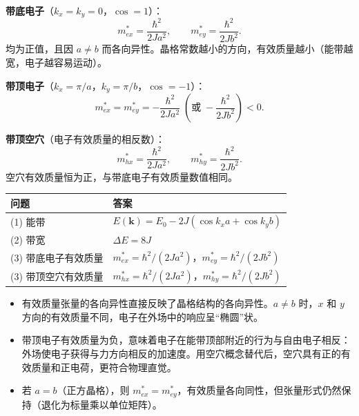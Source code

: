 \begin{derivationbox}[标准解题过程]
\textbf{带底电子}（$k_x=k_y=0$，$\cos=1$）：
\begin{equation}
\boxed{m_{ex}^*=\frac{\hbar^2}{2Ja^2},\qquad m_{ey}^*=\frac{\hbar^2}{2Jb^2}.}
\end{equation}
均为正值，且因 $a\neq b$ 而各向异性。晶格常数越小的方向，有效质量越小（能带越宽，电子越容易运动）。

\textbf{带顶电子}（$k_x=\pi/a$，$k_y=\pi/b$，$\cos=-1$）：
\begin{equation}
m_{ex}^*=m_{ey}^*=-\frac{\hbar^2}{2Ja^2}\;(\text{或}\;-\frac{\hbar^2}{2Jb^2})<0.
\end{equation}

\textbf{带顶空穴}（电子有效质量的相反数）：
\begin{equation}
\boxed{m_{hx}^*=\frac{\hbar^2}{2Ja^2},\qquad m_{hy}^*=\frac{\hbar^2}{2Jb^2}.}
\end{equation}
空穴有效质量恒为正，与带底电子有效质量数值相同。
\end{derivationbox}

\begin{formulabox}[答案汇总]
\begin{center}
\begin{tabular}{ll}
\toprule
\textbf{问题} & \textbf{答案} \\
\midrule
(1) 能带 & $E(\bm{k})=E_0-2J(\cos k_xa+\cos k_yb)$ \\
(2) 带宽 & $\Delta E=8J$ \\
(3) 带底电子有效质量 & $m_{ex}^*=\hbar^2/(2Ja^2)$，$m_{ey}^*=\hbar^2/(2Jb^2)$ \\
(3) 带顶空穴有效质量 & $m_{hx}^*=\hbar^2/(2Ja^2)$，$m_{hy}^*=\hbar^2/(2Jb^2)$ \\
\bottomrule
\end{tabular}
\end{center}
\end{formulabox}

\begin{insightbox}[物理图像]
\begin{itemize}
    \item 有效质量张量的各向异性直接反映了晶格结构的各向异性。$a\neq b$ 时，$x$ 和 $y$ 方向的有效质量不同，电子在外场中的响应呈``椭圆''状。
    \item 带顶电子有效质量为负，意味着电子在能带顶部附近的行为与自由电子相反：外场使电子获得与力方向相反的加速度。用空穴概念替代后，空穴具有正的有效质量和正电荷，更符合物理直觉。
    \item 若 $a=b$（正方晶格），则 $m_{ex}^*=m_{ey}^*$，有效质量各向同性，但张量形式仍然保持（退化为标量乘以单位矩阵）。
\end{itemize}
\end{insightbox}
